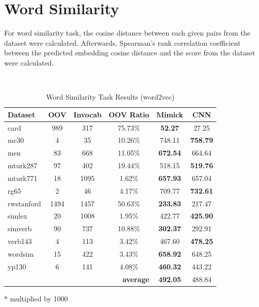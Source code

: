     \section{Word Similarity}
    For word similarity task, the cosine distance between each given
    pairs from the dataset were calculated. Afterwards, Spearman's rank
    correlation coefficient between the predicted embedding cosine
    distance and the score from the dataset were calculated.

    \begin{table}[!ht]
      \begin{threeparttable} 
      \begin{center}
        \caption{Word Similarity Task Results (word2vec)}
        ~\\
        \label{tab:wordsim:word2vec}
        \begin{tabular}{l|c|c|c|c|c}
          \textbf{Dataset} & \textbf{OOV} & \textbf{Invocab} & \textbf{OOV Ratio} & \textbf{Mimick}\tnote{*} & \textbf{CNN}\tnote{*}\\
          \hline
          card & 989 & 317 & 75.73\% & \textbf{52.27} & 27.25\\
          mc30 & 4 & 35 & 10.26\% & 748.11 & \textbf{758.79}\\
          men & 83 & 668 & 11.05\% & \textbf{672.54} & 664.64\\
          mturk287 & 97 & 402 & 19.44\% & 518.15 & \textbf{519.76}\\
          mturk771 & 18 & 1095 & 1.62\% & \textbf{657.93} & 657.04\\
          rg65 & 2 & 46 & 4.17\% & 709.77 & \textbf{732.61}\\
          rwstanford & 1494 & 1457 & 50.63\% & \textbf{233.83} & 217.47\\
          simlex & 20 & 1008 & 1.95\% & 422.77 & \textbf{425.90}\\
          simverb & 90 & 737 & 10.88\% & \textbf{302.37} & 292.91\\
          verb143 & 4 & 113 & 3.42\% & 467.60 & \textbf{478.25}\\
          wordsim & 15 & 422 & 3.43\% & \textbf{658.92} & 648.25\\
          yp130 & 6 & 141 & 4.08\% & \textbf{460.32} & 443.22\\
          \hline
          \multicolumn{4}{r|}{\textbf{average}} & \textbf{492.05} & 488.84\\
        \end{tabular}
        \begin{tablenotes}
          \item[*] multiplied by 1000
        \end{tablenotes}
      \end{center}
      
    \end{threeparttable} 
    \end{table}
